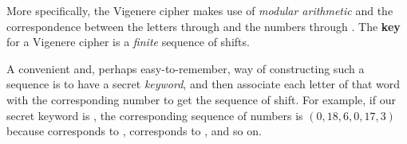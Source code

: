 \documentclass[letterpaper]{article}
\begin{document}
\bigskip 

More specifically, the Vigenere cipher makes use of \emph{modular arithmetic} and the correspondence between the letters  through  and the numbers  through . The \textbf{key} for a Vigenere cipher is a \emph{finite} sequence of shifts. 

\bigskip 

A convenient and, perhaps easy-to-remember, way of constructing such a sequence is to have a secret \emph{keyword}, and then associate each letter of that word with the corresponding number to get the sequence of shift. For example, if our secret keyword is , the corresponding sequence of numbers is $(0, 18, 6, 0, 17, 3)$ because  corresponds to ,  corresponds to , and so on.
\end{document}
